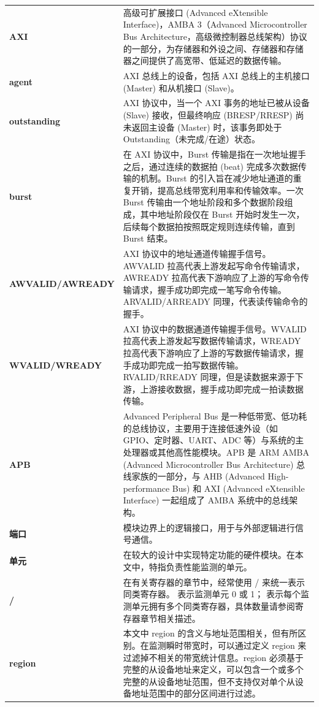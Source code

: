 \documentclass[main\_\_CN.tex]{subfiles}
\begin{document}
\begin{longtable}[c]{ R{2.5cm} p{13.5cm} }
    \textbf{AXI} & 高级可扩展接口 (Advanced eXtensible Interface)，AMBA 3（Advanced Microcontroller Bus Architecture，高级微控制器总线架构）协议的一部分，为存储器和外设之间、存储器和存储器之间提供了高宽带、低延迟的数据传输。\\
    \textbf{agent} & AXI 总线上的设备，包括 AXI 总线上的主机接口 (Master) 和从机接口 (Slave)。\\
    \textbf{outstanding} & AXI 协议中，当一个 AXI 事务的地址已被从设备 (Slave) 接收，但最终响应 (BRESP/RRESP) 尚未返回主设备 (Master) 时，该事务即处于 Outstanding（未完成/在途）状态。\\
    \textbf{burst} & 在 AXI 协议中，Burst 传输是指在一次地址握手之后，通过连续的数据拍 (beat) 完成多次数据传输的机制。Burst 的引入旨在减少地址通道的重复开销，提高总线带宽利用率和传输效率。一次 Burst 传输由一个地址阶段和多个数据阶段组成，其中地址阶段仅在 Burst 开始时发生一次，后续每个数据拍按照既定规则连续传输，直到 Burst 结束。\\
    \textbf{AWVALID/AWREADY} & AXI 协议中的地址通道传输握手信号。AWVALID 拉高代表上游发起写命令传输请求，AWREADY 拉高代表下游响应了上游的写命令传输请求，握手成功即完成一笔写命令传输。ARVALID/ARREADY 同理，代表读传输命令的握手。 \\
    \textbf{WVALID/WREADY} & AXI 协议中的数据通道传输握手信号。WVALID 拉高代表上游发起写数据传输请求，WREADY 拉高代表下游响应了上游的写数据传输请求，握手成功即完成一拍写数据传输。RVALID/RREADY 同理，但是读数据来源于下游，上游接收数据，握手成功即完成一拍读数据传输。\\
    \textbf{APB} & Advanced Peripheral Bus 是一种低带宽、低功耗的总线协议，主要用于连接低速外设（如 GPIO、定时器、UART、ADC 等）与系统的主处理器或其他高性能模块。APB 是 ARM AMBA (Advanced Microcontroller Bus Architecture) 总线家族的一部分，与 AHB (Advanced High-performance Bus) 和 AXI (Advanced eXtensible Interface) 一起组成了 AMBA 系统中的总线架构。\\
    \textbf{端口} & 模块边界上的逻辑接口，用于与外部逻辑进行信号通信。\\
    \textbf{单元} & 在较大的设计中实现特定功能的硬件模块。在本文中，特指负责性能监测的单元。\\
    \textbf{/} & 在有关寄存器的章节中，经常使用 / 来统一表示同类寄存器。 表示监测单元 0 或 1； 表示每个监测单元拥有多个同类寄存器，具体数量请参阅寄存器章节相关描述。\\
    \textbf{region} & 本文中 region 的含义与地址范围相关，但有所区别。在监测瞬时带宽时，可以通过定义 region 来过滤掉不相关的带宽统计信息。region 必须基于完整的从设备地址来定义，可以包含一个或多个完整的从设备地址范围，但不支持仅对单个从设备地址范围中的部分区间进行过滤。
\end{longtable}
\end{document}

